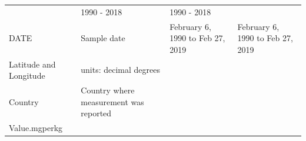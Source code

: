 \documentclass[
  12pt,
]{article}
\begin{document}
\begin{longtable}[]{@{}llll@{}}
\begin{minipage}[t]{0.22\columnwidth}
\end{minipage} & \begin{minipage}[t]{0.26\columnwidth}\raggedright
1990 - 2018\strut
\end{minipage} & \begin{minipage}[t]{0.26\columnwidth}\raggedright
1990 - 2018\strut
\end{minipage}\tabularnewline
\begin{minipage}[t]{0.15\columnwidth}\raggedright
DATE\strut
\end{minipage} & \begin{minipage}[t]{0.22\columnwidth}\raggedright
Sample date\strut
\end{minipage} & \begin{minipage}[t]{0.26\columnwidth}\raggedright
February 6, 1990 to Feb 27, 2019\strut
\end{minipage} & \begin{minipage}[t]{0.26\columnwidth}\raggedright
February 6, 1990 to Feb 27, 2019\strut
\end{minipage}\tabularnewline
\begin{minipage}[t]{0.15\columnwidth}\raggedright
Latitude and Longitude\strut
\end{minipage} & \begin{minipage}[t]{0.22\columnwidth}\raggedright
units: decimal degrees\strut
\end{minipage} & \begin{minipage}[t]{0.26\columnwidth}\raggedright
\strut
\end{minipage} & \begin{minipage}[t]{0.26\columnwidth}\raggedright
\strut
\end{minipage}\tabularnewline
\begin{minipage}[t]{0.15\columnwidth}\raggedright
Country\strut
\end{minipage} & \begin{minipage}[t]{0.22\columnwidth}\raggedright
Country where measurement was reported\strut
\end{minipage} & \begin{minipage}[t]{0.26\columnwidth}\raggedright
\strut
\end{minipage} & \begin{minipage}[t]{0.26\columnwidth}\raggedright
\strut
\end{minipage}\tabularnewline
\begin{minipage}[t]{0.15\columnwidth}\raggedright
Value.mgperkg\strut
\end{minipage} & \begin{minipage}[t]{0.22\columnwidth}\raggedright

\end{minipage}
\end{longtable}
\end{document}
